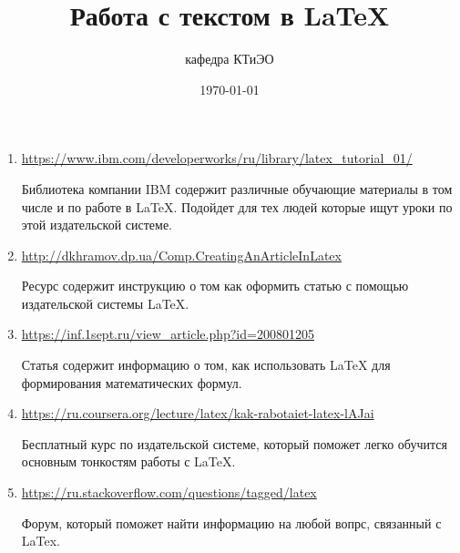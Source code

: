 \documentclass[a4paper,12pt]{article} %
\author{кафедра КТиЭО}
\title{Работа с текстом в \LaTeX{}}
\date{\today}
\begin{document}
\begin{enumerate}
    \item \url{https://www.ibm.com/developerworks/ru/library/latex_tutorial_01/}
    
    Библиотека компании IBM содержит различные обучающие материалы в том числе и по работе в LaTeX. Подойдет для тех людей которые ищут уроки по этой издательской системе.
    
    \item \url{http://dkhramov.dp.ua/Comp.CreatingAnArticleInLatex}
    
    Ресурс содержит инструкцию о том как оформить статью с помощью издательской системы LaTeX.
    
    \item \url{https://inf.1sept.ru/view_article.php?id=200801205}
    
    Статья содержит информацию о том, как использовать LaTeX для формирования математических формул. 
    
    \item \url{https://ru.coursera.org/lecture/latex/kak-rabotaiet-latex-lAJai}
    
    Бесплатный курс по издательской системе, который поможет легко обучится основным тонкостям работы с LaTeX.
    
    \item \url{https://ru.stackoverflow.com/questions/tagged/latex}
    
    Форум, который поможет найти информацию на любой вопрс, связанный с LaTex.
    
\end{enumerate}
\end{document}
